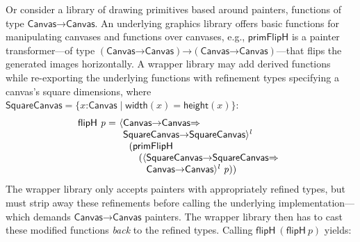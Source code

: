 \documentclass[9pt]{extarticle}
\newcommand{\ottnt}[1]{\mathit{#1}}
\newcommand{\ottsym}[1]{#1}
\begin{document}
Or consider a library of drawing primitives based
around painters, functions of type $  \mathsf{Canvas}  \mathord{ \rightarrow }  \mathsf{Canvas}  $.
An underlying graphics library offers basic functions for manipulating
canvases and functions over canvases, e.g., $ \mathsf{primFlipH} $ is a
painter transformer---of type
$  (   \mathsf{Canvas}  \mathord{ \rightarrow }  \mathsf{Canvas}   )  \mathord{ \rightarrow }  (   \mathsf{Canvas}  \mathord{ \rightarrow }  \mathsf{Canvas}   )  $---that flips the generated
images horizontally.
A wrapper library may add derived functions while re-exporting the
underlying functions with refinement types specifying a canvas's square
dimensions, where $ \mathsf{SquareCanvas}   \ottsym{=}   \{ \mathit{x} \mathord{:}  \mathsf{Canvas}  \mathrel{\mid}   \mathsf{width}   \ottsym{(}  \mathit{x}  \ottsym{)}  \mathrel{=}   \mathsf{height}   \ottsym{(}  \mathit{x}  \ottsym{)}  \} $:
\[ \begin{array}{@{}r@{~}l}
    \mathsf{flipH}  ~ \mathit{p}  =&  \langle    \mathsf{Canvas}  \mathord{ \rightarrow }  \mathsf{Canvas}    \mathord{ \overset{    }{\Rightarrow} }   {} \\  &  \phantom{\langle}   \mathsf{SquareCanvas}  \mathord{ \rightarrow }  \mathsf{SquareCanvas}    \rangle^{ \ottnt{l} } ~  {} \\  &  \quad   (   \mathsf{primFlipH}  ~ {} \\  &  \qquad   (  \langle    \mathsf{SquareCanvas}  \mathord{ \rightarrow }  \mathsf{SquareCanvas}    \mathord{ \overset{    }{\Rightarrow} }   {} \\  &  \qquad  \phantom{(}  \phantom{\langle}   \mathsf{Canvas}  \mathord{ \rightarrow }  \mathsf{Canvas}    \rangle^{ \ottnt{l} } ~  \mathit{p}  )   )  
\end{array}
\]
The wrapper library only accepts painters with appropriately refined
types, but must strip away these refinements before calling the
underlying implementation---which demands $  \mathsf{Canvas}  \mathord{ \rightarrow }  \mathsf{Canvas}  $
painters. The wrapper library then has to cast these modified
functions \textit{back} to the refined types. Calling $  \mathsf{flipH}  ~  (   \mathsf{flipH}  ~ \mathit{p}  )  $ yields:
\end{document}
